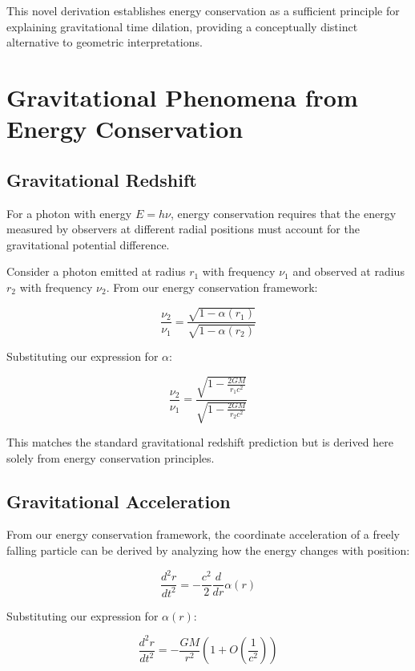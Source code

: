 \documentclass[11pt,a4paper]{article}
\begin{document}
This novel derivation establishes energy conservation as a sufficient principle for explaining gravitational time dilation, providing a conceptually distinct alternative to geometric interpretations.

\section{Gravitational Phenomena from Energy Conservation}\label{sec:phenom}

\subsection{Gravitational Redshift}
For a photon with energy $E = h\nu$, energy conservation requires that the energy measured by observers at different radial positions must account for the gravitational potential difference.

Consider a photon emitted at radius $r_1$ with frequency $\nu_1$ and observed at radius $r_2$ with frequency $\nu_2$. From our energy conservation framework:

\begin{equation}
    \frac{\nu_2}{\nu_1} = \frac{\sqrt{1-\alpha(r_1)}}{\sqrt{1-\alpha(r_2)}}
\end{equation}

Substituting our expression for $\alpha$:

\begin{equation}
    \frac{\nu_2}{\nu_1} = \frac{\sqrt{1-\frac{2GM}{r_1c^2}}}{\sqrt{1-\frac{2GM}{r_2c^2}}}
\end{equation}

This matches the standard gravitational redshift prediction but is derived here solely from energy conservation principles.

\subsection{Gravitational Acceleration}
From our energy conservation framework, the coordinate acceleration of a freely falling particle can be derived by analyzing how the energy changes with position:

\begin{equation}
    \frac{d^2r}{dt^2} = -\frac{c^2}{2}\frac{d}{dr}\alpha(r)
\end{equation}

Substituting our expression for $\alpha(r)$:

\begin{equation}
    \frac{d^2r}{dt^2} = -\frac{GM}{r^2}\left(1 + O\left(\frac{1}{c^2}\right)\right)
\end{equation}
\end{document}
